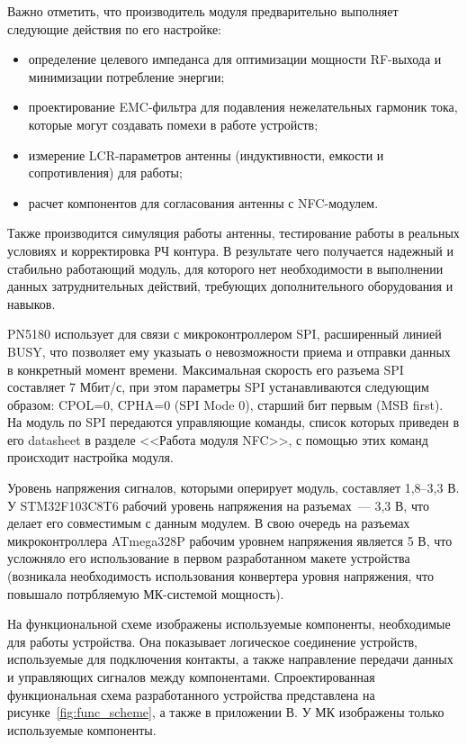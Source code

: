 Важно отметить, что производитель модуля предварительно выполняет следующие действия по его настройке:
\begin{itemize}
    \item определение целевого импеданса для оптимизации мощности RF-выхода и минимизации потребление энергии;
    \item проектирование EMC-фильтра для подавления нежелательных гармоник тока, которые могут создавать помехи в работе устройств;
    \item измерение LCR-параметров антенны (индуктивности, емкости и сопротивления) для работы;
    \item расчет компонентов для согласования антенны с NFC-модулем.
\end{itemize}

Также производится симуляция работы антенны, тестирование работы в реальных условиях и корректировка РЧ контура.
В результате чего получается надежный и стабильно работающий модуль, для которого нет необходимости в выполнении данных затруднительных действий, требующих дополнительного оборудования и навыков.


PN5180 использует для связи с микроконтроллером SPI, расширенный линией BUSY, что позволяет ему указыать о невозможности приема и отправки данных в конкретный момент времени.
Максимальная скорость его разъема SPI составляет 7 Мбит/с, при этом параметры SPI устанавливаются следующим образом: CPOL=0, CPHA=0 (SPI Mode 0), старший бит первым (MSB first).
На модуль по SPI передаются управляющие команды, список которых приведен в его datasheet в разделе <<Работа модуля NFC>>, с помощью этих команд происходит настройка модуля\cite{pn5180_datasheet}.

Уровень напряжения сигналов, которыми оперирует модуль, составляет 1,8--3,3 В.
У STM32F103C8T6 рабочий уровень напряжения на разъемах~--- 3,3 В, что делает его совместимым с данным модулем.
В свою очередь на разъемах микроконтроллера ATmega328P рабочим уровнем напряжения является 5 В, что усложняло его использование в первом разработанном макете устройства (возникала необходимость использования конвертера уровня напряжения, что повышало потрбляемую МК-системой мощность).


На функциональной схеме изображены используемые компоненты, необходимые для работы устройства.
Она показывает логическое соединение устройств, используемые для подключения контакты, а также направление передачи данных и управляющих сигналов между компонентами.
Спроектированная функциональная схема разработанного устройства представлена на рисунке~\ref{fig:func_scheme}, а также в приложении В.
У МК изображены только используемые компоненты.

